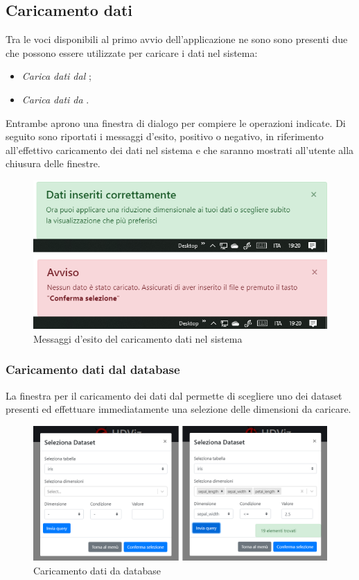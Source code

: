 \newpage

\subsection{Caricamento dati}

Tra le voci disponibili al primo avvio dell'applicazione ne sono sono presenti due che possono essere utilizzate per caricare i dati nel sistema:
\begin{itemize}
	\item \textit{Carica dati dal };
	\item \textit{Carica dati da }.
\end{itemize}

Entrambe aprono una finestra di dialogo per compiere le operazioni indicate.
Di seguito sono riportati i messaggi d'esito, positivo o negativo, in riferimento all'effettivo caricamento dei dati nel sistema e che saranno mostrati all'utente alla chiusura delle finestre.

	\begin{figure}[H]
		\includegraphics[scale=0.8]{Images/doubleEsito.png}
		\centering
		\caption{Messaggi d'esito del caricamento dati nel sistema}
	\end{figure}
\newpage
\subsubsection{Caricamento dati dal database}
La finestra per il caricamento dei dati dal  permette di scegliere uno dei dataset presenti ed effettuare immediatamente una selezione delle dimensioni da caricare.
	
	\begin{figure}[H]
		\includegraphics[scale=0.6]{Images/double.png}
		\centering
		\caption{Caricamento dati da database}
	\end{figure}
	
